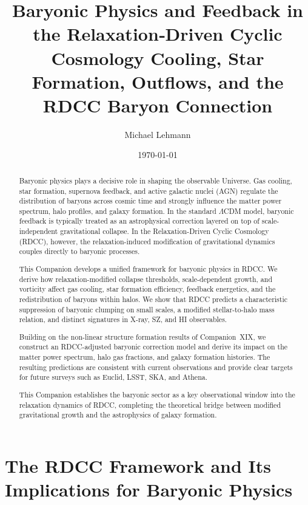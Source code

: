 \documentclass[11pt,a4paper]{article}
\title{\textbf{Baryonic Physics and Feedback in the Relaxation‑Driven Cyclic Cosmology  
Cooling, Star Formation, Outflows, and the RDCC Baryon Connection}}
\author[1]{Michael Lehmann}
\affil[1]{\small Independent Researcher, Relaxation-Driven Cyclic Cosmology (RDCC) Framework\\
\texttt{mi.lehmann@gmx.de}}
\date{\small \today}
\begin{document}
\maketitle

\begin{abstract}
Baryonic physics plays a decisive role in shaping the observable Universe. Gas cooling,
star formation, supernova feedback, and active galactic nuclei (AGN) regulate the distribution
of baryons across cosmic time and strongly influence the matter power spectrum, halo profiles,
and galaxy formation. In the standard $\Lambda$CDM model, baryonic feedback is typically
treated as an astrophysical correction layered on top of scale-independent gravitational collapse.
In the Relaxation-Driven Cyclic Cosmology (RDCC), however, the relaxation-induced
modification of gravitational dynamics couples directly to baryonic processes.

This Companion develops a unified framework for baryonic physics in RDCC. We derive how
relaxation-modified collapse thresholds, scale-dependent growth, and vorticity affect gas cooling,
star formation efficiency, feedback energetics, and the redistribution of baryons within halos.
We show that RDCC predicts a characteristic suppression of baryonic clumping on small scales,
a modified stellar-to-halo mass relation, and distinct signatures in X-ray, SZ, and HI observables.

Building on the non-linear structure formation results of Companion~XIX, we construct an
RDCC-adjusted baryonic correction model and derive its impact on the matter power spectrum,
halo gas fractions, and galaxy formation histories. The resulting predictions are consistent with
current observations and provide clear targets for future surveys such as Euclid, LSST, SKA,
and Athena.

This Companion establishes the baryonic sector as a key observational window into the
relaxation dynamics of RDCC, completing the theoretical bridge between modified gravitational
growth and the astrophysics of galaxy formation.
\end{abstract}

\section{The RDCC Framework and Its Implications for Baryonic Physics}
\end{document}
